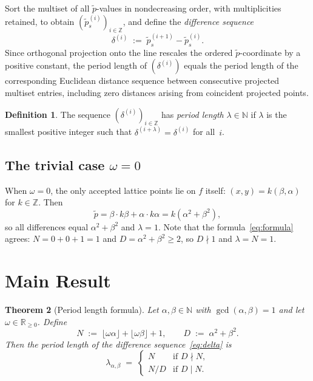 \documentclass[11pt]{article}
\theoremstyle{plain}
\newtheorem{theorem}{Theorem}[section]
\theoremstyle{definition}
\newtheorem{definition}[theorem]{Definition}
\theoremstyle{remark}
\begin{document}
Sort the multiset of all \(\tilde{p}\)-values in nondecreasing order, with
multiplicities retained, to obtain
\((\tilde{p}^{(i)}_s)_{i \in \mathbb{Z}}\), and define the
\emph{difference sequence}
\begin{equation}\label{eq:delta}
    \delta^{(i)} \;:=\; \tilde{p}^{(i+1)}_s - \tilde{p}^{(i)}_s.
\end{equation}
Since orthogonal projection onto the line rescales the ordered
\(\tilde p\)-coordinate by a positive constant, the period length of
\((\delta^{(i)})\) equals the period length of the corresponding Euclidean
distance sequence between consecutive projected multiset entries, including
zero distances arising from coincident projected points.

\begin{definition}\label{def:period}
The sequence \((\delta^{(i)})_{i \in \mathbb{Z}}\) has \emph{period length}
\(\lambda \in \mathbb{N}\) if \(\lambda\) is the smallest positive integer
such that \(\delta^{(i+\lambda)} = \delta^{(i)}\) for all~\(i\).
\end{definition}

\subsection{The trivial case \(\omega = 0\)}\label{subsec:omega0}

When \(\omega = 0\), the only accepted lattice points lie on \(f\) itself:
\((x, y) = k(\beta, \alpha)\) for \(k \in \mathbb{Z}\).
Then
\[
    \tilde{p} = \beta \cdot k\beta + \alpha \cdot k\alpha
    = k(\alpha^2+\beta^2),
\]
so all differences equal \(\alpha^2+\beta^2\) and \(\lambda = 1\).
Note that the formula~\eqref{eq:formula} agrees: \(N = 0 + 0 + 1 = 1\)
and \(D = \alpha^2+\beta^2 \ge 2\), so \(D \nmid 1\) and \(\lambda = N = 1\).

\section{Main Result}\label{sec:mainresult}

\begin{theorem}[Period length formula]\label{thm:main}
Let \(\alpha, \beta \in \mathbb{N}\) with \(\gcd(\alpha, \beta) = 1\) and let
\(\omega \in \mathbb{R}_{\ge 0}\).  Define
\begin{equation}\label{eq:ND}
    N \;:=\; \lfloor\omega\alpha\rfloor + \lfloor\omega\beta\rfloor + 1,
    \qquad
    D \;:=\; \alpha^2 + \beta^2.
\end{equation}
Then the period length of the difference sequence~\eqref{eq:delta} is
\begin{equation}\label{eq:formula}
    \lambda_{\alpha,\beta} \;=\;
    \begin{cases}
        N & \text{if } D \nmid N, \\[3pt]
        N / D & \text{if } D \mid N.
    \end{cases}
\end{equation}
\end{theorem}
\end{document}
